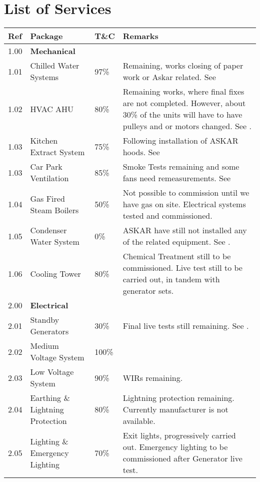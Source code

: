 \section*{List of Services}
\label{masterplan}

{\RaggedRight\small
\begin{longtable}{lllp{4.3cm}@{}}
\toprule
Ref	&Package	&T\&C	&Remarks\\
\midrule
1.00	&\textbf{Mechanical}	&	&\\
1.01	&Chilled Water Systems	&97\%	&Remaining, works closing of paper work or Askar related. See {chilledwater}\\
1.02	&HVAC AHU  & 80\%		&  Remaining works, where final fixes are not completed. However, about 30\% of the units will have to have pulleys and or motors changed. See {HVAC}.\\
1.03    &Kitchen Extract System &75\%& Following installation of ASKAR hoods. See {kitchenextract}\\
1.03	&Car Park Ventilation 	&85\%&Smoke Tests remaining and some fans need remeasurements. See {carparkventilation}\\
1.04	&Gas Fired Steam Boilers &50\%&Not possible to commission until we have gas on site. Electrical systems tested and commissioned.		\\
1.05	&Condenser Water System 	&0\%&ASKAR have still not installed any of the related equipment. See {chilledwaterconstraints}.    \\
1.06    &Cooling Tower &80\%&Chemical Treatment still to be commissioned. Live test still to be carried out, in tandem with generator sets. \\
\midrule
2.00	&\textbf{Electrical}		&&\\
2.01	&Standby Generators	&30\%& Final live tests still remaining. See \sref{generators}. \\	
2.02	&Medium Voltage System	&100\%&\\	
2.03	&Low Voltage System		&90\%&WIRs remaining.\\
2.04	&Earthing \& Lightning Protection &80\%&Lightning protection remaining. Currently manufacturer is not available.\\		
2.05	&Lighting \& Emergency Lighting  &70\%& Exit lights, progressively carried out. Emergency lighting to be commissioned after Generator live test.\\		

\end{longtable}}
